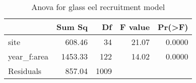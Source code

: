\begin{table}[htbp]
\centering
\caption[table_anova]{Anova for glass eel recruitment model} 
\begin{tabularx}{0.8\textwidth}{lrrrr}
  \hline
 & Sum Sq & Df & F value & Pr(>F) \\ 
  \hline
site & 608.46 & 34 & 21.07 & 0.0000 \\ 
  year\_f:area & 1453.33 & 122 & 14.02 & 0.0000 \\ 
  Residuals & 857.04 & 1009 &  &  \\ 
   \hline
\end{tabularx}
\end{table}
